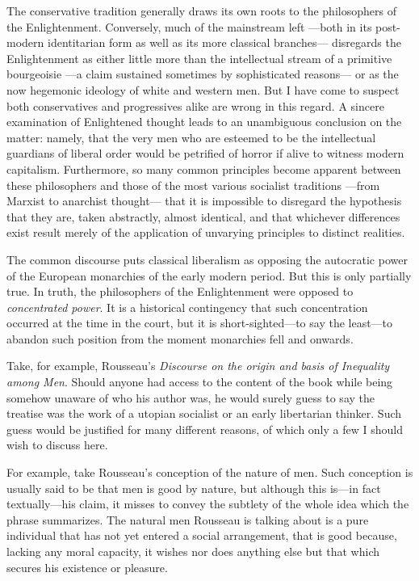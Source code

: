 \documentclass[a4paper]{article}
\begin{document}
The conservative tradition generally draws its own roots to the philosophers of
the Enlightenment. Conversely, much of the mainstream left ---both in its
post-modern identitarian form as well as its more classical branches---
disregards the Enlightenment as either little more than the intellectual
stream of a primitive bourgeoisie ---a claim sustained sometimes by sophisticated
reasons--- or as the now hegemonic ideology of white and western men. But I have
come to suspect both conservatives and progressives alike are wrong in this
regard. A sincere examination of Enlightened thought leads to an unambiguous
conclusion on the matter: namely, that the very men who are esteemed to be the
intellectual guardians of liberal order would be petrified of horror if alive to
witness modern capitalism. Furthermore, so many common principles become apparent
between these philosophers and those of the most various socialist traditions
---from Marxist to anarchist thought--- that it is impossible to disregard the
hypothesis that they are, taken abstractly, almost identical, and that whichever
differences exist result merely of the application of unvarying principles to
distinct realities.

The common discourse puts classical liberalism as opposing the autocratic
power of the European monarchies of the early modern period. But this is only
partially true. In truth, the philosophers of the Enlightenment were opposed to
\textit{concentrated power}. It is a historical contingency that such
concentration occurred at the time in the court, but it is short-sighted---to
say the least---to abandon such position from the moment monarchies fell and
onwards.

Take, for example, Rousseau's \textit{Discourse on the origin and basis of
Inequality among Men}. Should anyone had access to the content of the book while
being somehow unaware of who his author was, he would surely guess to say the treatise
was the work of a utopian socialist or an early libertarian thinker. Such guess
would be justified for many different reasons, of which only a few I should wish
to discuss here. 

For example, take Rousseau's conception of the nature of men. Such conception is
usually said to be that men is good by nature, but although this is---in fact
textually---his claim, it misses to convey the subtlety of the whole
idea which the phrase summarizes. The natural men Rousseau is talking about is
a pure individual that has not yet entered a social arrangement, that is good
because, lacking any moral capacity, it wishes nor does anything else but that
which secures his existence or pleasure.






    
\end{document}
